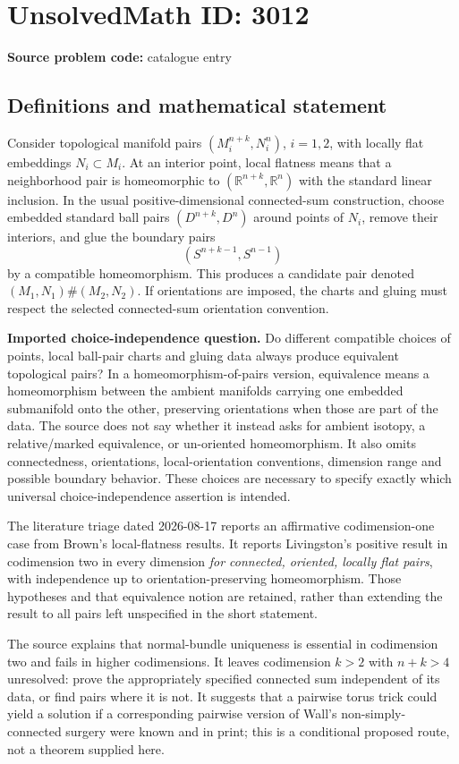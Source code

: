 \documentclass[11pt]{article}
\newcommand{\R}{\mathbb{R}}
\begin{document}
\section*{UnsolvedMath ID: 3012}
\textbf{Source problem code:} catalogue entry
\subsection{Definitions and mathematical statement}
Consider topological manifold pairs $(M_i^{n+k},N_i^n)$, $i=1,2$, with locally flat embeddings $N_i\subset M_i$. At an interior point, local flatness means that a neighborhood pair is homeomorphic to $(\R^{n+k},\R^n)$ with the standard linear inclusion. In the usual positive-dimensional connected-sum construction, choose embedded standard ball pairs $(D^{n+k},D^n)$ around points of $N_i$, remove their interiors, and glue the boundary pairs
\[
 (S^{n+k-1},S^{n-1})
\]
by a compatible homeomorphism. This produces a candidate pair denoted $(M_1,N_1)\#(M_2,N_2)$. If orientations are imposed, the charts and gluing must respect the selected connected-sum orientation convention.

\textbf{Imported choice-independence question.} Do different compatible choices of points, local ball-pair charts and gluing data always produce equivalent topological pairs? In a homeomorphism-of-pairs version, equivalence means a homeomorphism between the ambient manifolds carrying one embedded submanifold onto the other, preserving orientations when those are part of the data. The source does not say whether it instead asks for ambient isotopy, a relative/marked equivalence, or un-oriented homeomorphism. It also omits connectedness, orientations, local-orientation conventions, dimension range and possible boundary behavior. These choices are necessary to specify exactly which universal choice-independence assertion is intended.

The literature triage dated 2026-08-17 reports an affirmative codimension-one case from Brown's local-flatness results. It reports Livingston's positive result in codimension two in every dimension \emph{for connected, oriented, locally flat pairs}, with independence up to orientation-preserving homeomorphism. Those hypotheses and that equivalence notion are retained, rather than extending the result to all pairs left unspecified in the short statement.

The source explains that normal-bundle uniqueness is essential in codimension two and fails in higher codimensions. It leaves codimension $k>2$ with $n+k>4$ unresolved: prove the appropriately specified connected sum independent of its data, or find pairs where it is not. It suggests that a pairwise torus trick could yield a solution if a corresponding pairwise version of Wall's non-simply-connected surgery were known and in print; this is a conditional proposed route, not a theorem supplied here.
\end{document}
